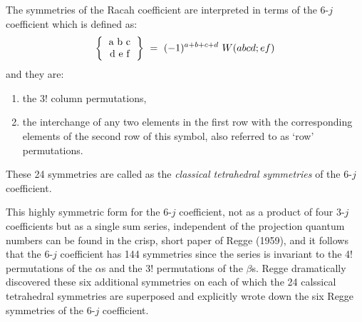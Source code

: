 The symmetries of the Racah coefficient are interpreted in terms of the 6-$j$ coefficient which is defined as:
\begin{equation}
\left\{\begin{tabular} {c} 
a\ b\ c\\ 
d\ e\ f \\ 
\end{tabular} \right\} 
\ =\ (-1)^{a+b+c+d}\ W(abcd;ef) \label{chap29-eq28}
\end{equation}
and they are:
\begin{enumerate}
\item the 3! column permutations,
\item the interchange of any two elements in the first row with the corresponding elements of the second row of this symbol, also referred to as `row' permutations.
\end{enumerate}

These 24 symmetries are called as the \textit{classical tetrahedral symmetries} of the 6-$j$ coefficient.

This highly symmetric form for the 6-$j$ coefficient, not as a product of four 
3-$j$ coefficients but as a single sum series, independent of the projection quantum
numbers can be found in the crisp, short paper of Regge (1959), and it follows that
the 6-$j$ coefficient has 144 symmetries since the series is invariant to the 4! 
permutations of the $\alpha$s and the 3! permutations of the $\beta$s. Regge 
dramatically discovered these six additional symmetries on each of which the 24 
calssical tetrahedral symmetries are superposed and explicitly wrote down the 
six Regge symmetries of the 6-$j$ coefficient.

